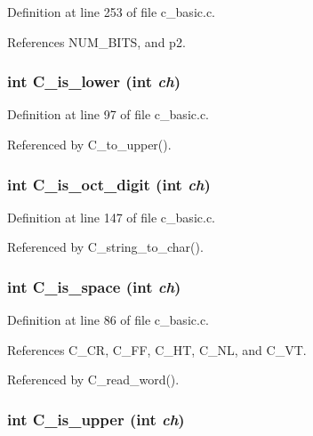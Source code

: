 Definition at line 253 of file c\_\-basic.c.

References NUM\_\-BITS, and p2.
\subsubsection{\setlength{\rightskip}{0pt plus 5cm}int C\_\-is\_\-lower (int {\em ch})}\label{c__basic_8h_c44d43034c58f3d75a511f23386189d8}




Definition at line 97 of file c\_\-basic.c.

Referenced by C\_\-to\_\-upper().
\subsubsection{\setlength{\rightskip}{0pt plus 5cm}int C\_\-is\_\-oct\_\-digit (int {\em ch})}\label{c__basic_8h_c3259292c22a7cf7a67517f74a588130}




Definition at line 147 of file c\_\-basic.c.

Referenced by C\_\-string\_\-to\_\-char().
\subsubsection{\setlength{\rightskip}{0pt plus 5cm}int C\_\-is\_\-space (int {\em ch})}\label{c__basic_8h_8ee6cd71e0b75f06a42c70d0cfc132f4}




Definition at line 86 of file c\_\-basic.c.

References C\_\-CR, C\_\-FF, C\_\-HT, C\_\-NL, and C\_\-VT.

Referenced by C\_\-read\_\-word().
\subsubsection{\setlength{\rightskip}{0pt plus 5cm}int C\_\-is\_\-upper (int {\em ch})}\label{c__basic_8h_59fceb3eb31dd1aaf2e2040ae2565e0d}




